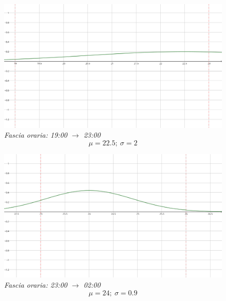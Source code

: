 \documentclass[a4paper, 12pt]{article}
\begin{document}
\begin{figure}
\includegraphics[width=\textwidth]{19-23-gaussian}
\centering \textit{Fascia oraria: 19:00 $\rightarrow$ 23:00}
\[ \mu = 22.5;\ \sigma = 2 \]
\end{figure}

\begin{figure}
\includegraphics[width=\textwidth]{23-02-gaussian}
\centering \textit{Fascia oraria: 23:00 $\rightarrow$ 02:00}
\[ \mu = 24;\ \sigma = 0.9 \]
\end{figure}
\end{document}
